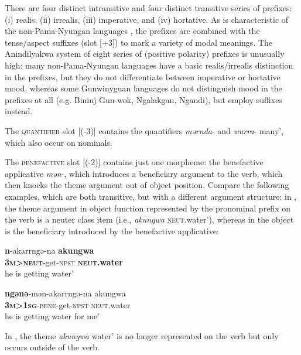 \documentclass[output=paper]{langscibook}
\begin{document}
There are four distinct intransitive and four distinct transitive series of prefixes: (i) realis, (ii) irrealis, (iii) imperative, and (iv) hortative. As is characteristic of the non-Pama-Nyungan languages \citep{Verstraete2005}, the prefixes are combined with the tense/aspect suffixes (slot [+3]) to mark a variety of modal meanings. The Anindilyakwa system of eight series of (positive polarity) prefixes is unusually high: many non-Pama-Nyungan languages have a basic realis/irrealis distinction in the prefixes, but they do not differentiate between imperative or hortative mood, whereas some Gunwinyguan languages do not distinguish mood in the prefixes at all (e.g. Bininj Gun-wok, Ngalakgan, Ngandi), but employ suffixes instead.



The \textsc{quantifier} slot [(-3)] contains the quantifiers \textit{mərnda}- and \textit{wurra}- many’, which also occur on nominals.



The \textsc{benefactive} slot [(-2)] contains just one morpheme: the benefactive applicative \textit{mən}-, which introduces a beneficiary argument to the verb, which then knocks the theme argument out of object position. Compare the following examples, which are both transitive, but with a different argument structure: in , the theme argument in object function represented by the pronominal prefix on the verb is a neuter class item (i.e., \textit{akungwa} \textsc{neut}.water’), whereas in  the object is the beneficiary introduced by the benefactive applicative:



\ea%
 \label{ex:vanegmond:6}

 \ea
 \label{ex:vanegmond:6a}
\gll \textbf{n}{-akarrngə-na} \textbf{{akungwa}}\\
 \textbf{\textsc{3m>}}\textbf{\textsc{neut}}-get-\textsc{npst} \textbf{\textsc{neut}}\textbf{.water}\\
\glt he is getting water’



 \ex
 \label{ex:vanegmond:6b}
\gll \textbf{ngənə}-mən-akarrngə-na akungwa\\
 \textbf{\textsc{3m>1sg}}-\textsc{bene}-get-\textsc{npst} \textsc{neut}.water\\
\glt he is getting water for me’
\z

\z

In , the theme \textit{akungwa} water’ is no longer represented on the verb but only occurs outside of the verb.
\end{document}
